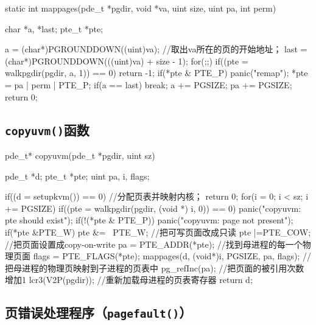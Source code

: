 \documentclass{swfuthesism}
\begin{document}
\begin{ccode}
static int
mappages(pde_t *pgdir, void *va, uint size, uint pa, int perm)
{
  char *a, *last;
  pte_t *pte;

  a = (char*)PGROUNDDOWN((uint)va); //取出va所在的页的开始地址；
  last = (char*)PGROUNDDOWN(((uint)va) + size - 1); 
  for(;;){
    if((pte = walkpgdir(pgdir, a, 1)) == 0)
      return -1;
    if(*pte & PTE_P)
      panic("remap");
    *pte = pa | perm | PTE_P;
    if(a == last)
      break;
    a += PGSIZE;
    pa += PGSIZE;
  }
  return 0;
}
\end{ccode}

\subsection{\texttt{copyuvm()}函数}
\label{sec:copyuvm}

\begin{ccode}
pde_t* copyuvm(pde_t *pgdir, uint sz)
{
  pde_t *d;
  pte_t *pte;
  uint pa, i, flags;

  if((d = setupkvm()) == 0) //分配页表并映射内核；
    return 0;
  for(i = 0; i < sz; i += PGSIZE){
    if((pte = walkpgdir(pgdir, (void *) i, 0)) == 0)
      panic("copyuvm: pte should exist");
    if(!(*pte & PTE_P))
      panic("copyuvm: page not present");
    if(*pte &PTE_W) {
      pte &= ~PTE_W; //把可写页面改成只读
      pte |=PTE_COW; //把页面设置成copy-on-write
    }
    pa = PTE_ADDR(*pte); //找到母进程的每一个物理页面
    flags = PTE_FLAGS(*pte);
    mappages(d, (void*)i, PGSIZE, pa, flags); //把母进程的物理页映射到子进程的页表中
    pg_refInc(pa);  //把页面的被引用次数增加1
  }
  lcr3(V2P(pgdir)); //重新加载母进程的页表寄存器
  return d;
}
\end{ccode}

\subsection{页错误处理程序（\texttt{pagefault()}）}
\label{sec:page-fault}
\end{document}

